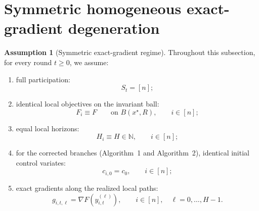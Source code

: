 \documentclass{article}
\theoremstyle{definition}
\newtheorem{assumption}[theorem]{Assumption}
\begin{document}


\section{Symmetric homogeneous exact-gradient degeneration}

\begin{assumption}[Symmetric exact-gradient regime]
\label{ass:symmetric_exact_regime}
Throughout this subsection, for every round $t \ge 0$, we assume:
\begin{enumerate}[label=(\roman*)]
    \item full participation:
    \[
    S_t = [n];
    \]
    \item identical local objectives on the invariant ball:
    \[
    F_i \equiv F \qquad \text{on } B(x^\star,R), \qquad i \in [n];
    \]
    \item equal local horizons:
    \[
    H_i \equiv H \in \mathbb{N}, \qquad i \in [n];
    \]
    \item for the corrected branches (Algorithm~1 and Algorithm~2), identical initial control variates:
    \[
    c_{i,0} = c_0, \qquad i \in [n];
    \]
    \item exact gradients along the realized local paths:
    \[
    g_{i,t,\ell} = \nabla F\!\left(y_{i,t}^{(\ell)}\right),
    \qquad i \in [n], \quad \ell = 0,\dots,H-1 .
    \]
\end{enumerate}
\end{assumption}
\end{document}
